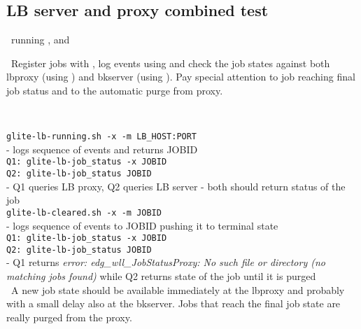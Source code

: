

\subsection{LB server and proxy combined test}

\req\ running ,  and

\what\ Register jobs with , log events
using  and check the job states against
both lbproxy (using ) and bkserver
(using ). Pay special attention to job reaching final 
job status and to the automatic purge from proxy.


\how\ 

{\tt glite-lb-running.sh -x -m LB\_HOST:PORT} \\
- logs sequence of events and returns JOBID \\

{\tt Q1: glite-lb-job\_status -x JOBID } \\
{\tt Q2: glite-lb-job\_status JOBID } \\
- Q1 queries LB proxy, Q2 queries LB server - both should return status of the job \\

{\tt glite-lb-cleared.sh -x -m JOBID} \\
- logs sequence of events to JOBID pushing it to terminal state \\

{\tt Q1: glite-lb-job\_status -x JOBID } \\
{\tt Q2: glite-lb-job\_status JOBID } \\
- Q1 returns {\em error: edg\_wll\_JobStatusProxy: No such file or directory (no matching jobs found)} while Q2 returns state of the job until it is purged \\

\result\ A new job state should be available immediately at the
lbproxy and probably with a small delay also at the bkserver. Jobs that reach the final job state
are really purged from the proxy.




